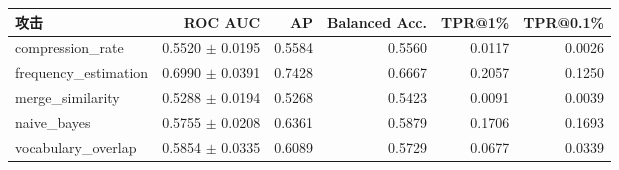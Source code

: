 \begin{tabular}{lrrrrr}
\toprule
攻击 & ROC AUC & AP & Balanced Acc. & TPR@1\% & TPR@0.1\% \\
\midrule
compression\_rate & 0.5520 $\pm$ 0.0195 & 0.5584 & 0.5560 & 0.0117 & 0.0026 \\
frequency\_estimation & 0.6990 $\pm$ 0.0391 & 0.7428 & 0.6667 & 0.2057 & 0.1250 \\
merge\_similarity & 0.5288 $\pm$ 0.0194 & 0.5268 & 0.5423 & 0.0091 & 0.0039 \\
naive\_bayes & 0.5755 $\pm$ 0.0208 & 0.6361 & 0.5879 & 0.1706 & 0.1693 \\
vocabulary\_overlap & 0.5854 $\pm$ 0.0335 & 0.6089 & 0.5729 & 0.0677 & 0.0339 \\
\bottomrule
\end{tabular}
